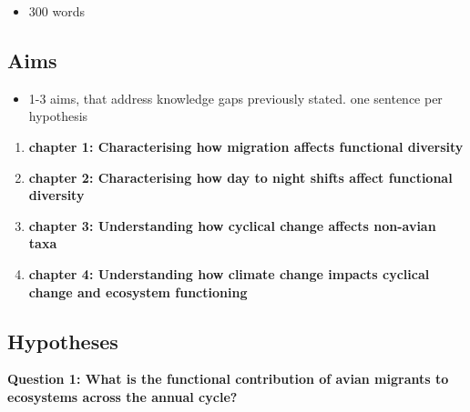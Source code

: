 \documentclass[11pt]{report}
\begin{document}
\begin{itemize}
\item 300 words
\end{itemize}

\subsection{Aims}\label{subsec2}

\begin{itemize}
\item 1-3 aims, that address knowledge gaps previously stated. one sentence per hypothesis
\end{itemize}

\begin {enumerate}
\item \textbf{chapter 1: Characterising how migration affects functional diversity}
\item \textbf{chapter 2: Characterising how day to night shifts affect functional diversity}
\item \textbf{chapter 3: Understanding how cyclical change affects non-avian taxa}
\item \textbf{chapter 4: Understanding how climate change impacts cyclical change and ecosystem functioning }
\end{enumerate}


\subsection{Hypotheses}\label{subsec3}

\textbf{Question 1: What is the functional contribution of avian migrants to ecosystems across the annual cycle?} 


\end{document}
